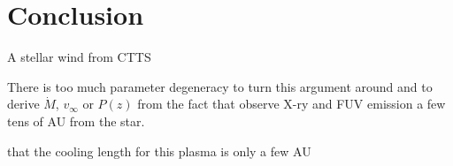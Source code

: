 \section{Conclusion}
\label{sect:conclusion}
A stellar wind from CTTS 

There is too much parameter degeneracy to turn this argument around and to derive $\dot M$, $v_\infty$ or $P(z)$ from the fact that observe X-ry and FUV emission a few tens of AU from the star.


\citet{2009A&A...493..579G} 
\citep{http://adsabs.harvard.edu/abs/2000ApJ...537L..49B}

that the cooling length for this plasma is only a few AU 
